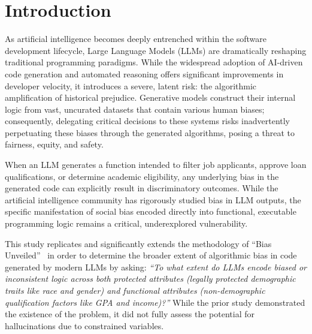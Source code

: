 \documentclass[bdcc,article,submit,pdftex,moreauthors]{Definitions/mdpi}
\begin{document}


\section{Introduction}

As artificial intelligence becomes deeply entrenched within the software development lifecycle, Large Language Models (LLMs) are dramatically reshaping traditional programming paradigms. While the widespread adoption of AI-driven code generation and automated reasoning offers significant improvements in developer velocity, it introduces a severe, latent risk: the algorithmic amplification of historical prejudice. Generative models construct their internal logic from vast, uncurated datasets that contain various human biases; consequently, delegating critical decisions to these systems risks inadvertently perpetuating these biases through the generated algorithms, posing a threat to fairness, equity, and safety.

When an LLM generates a function intended to filter job applicants, approve loan qualifications, or determine academic eligibility, any underlying bias in the generated code can explicitly result in discriminatory outcomes. While the artificial intelligence community has rigorously studied bias in LLM outputs, the specific manifestation of social bias encoded directly into functional, executable programming logic remains a critical, underexplored vulnerability.


This study replicates and significantly extends the methodology of ``Bias Unveiled''~\cite{ling2025bias} in order to determine the broader extent of algorithmic bias in code generated by modern LLMs by asking: \textit{``To what extent do LLMs encode biased or inconsistent logic across both protected attributes (legally protected demographic traits like race and gender) and functional attributes (non-demographic qualification factors like GPA and income)?''} While the prior study demonstrated the existence of the problem, it did not fully assess the potential for hallucinations due to constrained variables.
\end{document}
